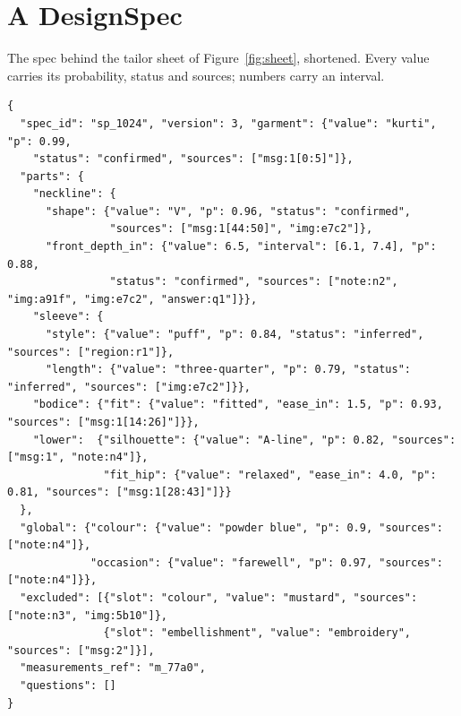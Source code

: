 \appendix
\chapter{A DesignSpec}\label{app:spec}

The spec behind the tailor sheet of Figure~\ref{fig:sheet}, shortened. Every value carries its probability, status and sources; numbers carry an interval.

\begin{lstlisting}
{
  "spec_id": "sp_1024", "version": 3, "garment": {"value": "kurti", "p": 0.99,
    "status": "confirmed", "sources": ["msg:1[0:5]"]},
  "parts": {
    "neckline": {
      "shape": {"value": "V", "p": 0.96, "status": "confirmed",
                "sources": ["msg:1[44:50]", "img:e7c2"]},
      "front_depth_in": {"value": 6.5, "interval": [6.1, 7.4], "p": 0.88,
                "status": "confirmed", "sources": ["note:n2", "img:a91f", "img:e7c2", "answer:q1"]}},
    "sleeve": {
      "style": {"value": "puff", "p": 0.84, "status": "inferred", "sources": ["region:r1"]},
      "length": {"value": "three-quarter", "p": 0.79, "status": "inferred", "sources": ["img:e7c2"]}},
    "bodice": {"fit": {"value": "fitted", "ease_in": 1.5, "p": 0.93, "sources": ["msg:1[14:26]"]}},
    "lower":  {"silhouette": {"value": "A-line", "p": 0.82, "sources": ["msg:1", "note:n4"]},
               "fit_hip": {"value": "relaxed", "ease_in": 4.0, "p": 0.81, "sources": ["msg:1[28:43]"]}}
  },
  "global": {"colour": {"value": "powder blue", "p": 0.9, "sources": ["note:n4"]},
             "occasion": {"value": "farewell", "p": 0.97, "sources": ["note:n4"]}},
  "excluded": [{"slot": "colour", "value": "mustard", "sources": ["note:n3", "img:5b10"]},
               {"slot": "embellishment", "value": "embroidery", "sources": ["msg:2"]}],
  "measurements_ref": "m_77a0",
  "questions": []
}
\end{lstlisting}
